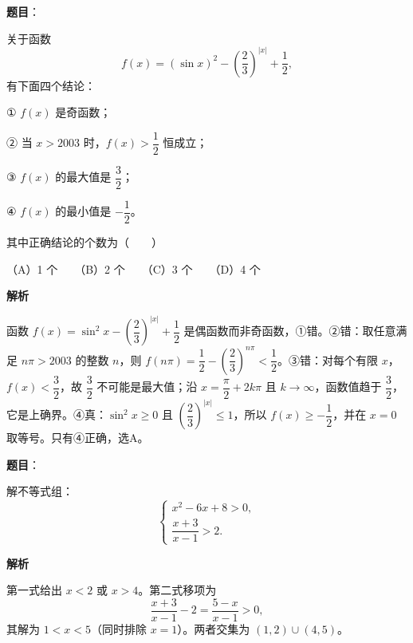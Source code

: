 \begin{answer}

\textbf{题目}：

关于函数
\nopagebreak[4]
\[
f(x)=(\sin x)^2-\left(\dfrac23\right)^{|x|}+\dfrac12,
\]
有下面四个结论：

① $f(x)$ 是奇函数；

② 当 $x>2003$ 时，$f(x)>\dfrac12$ 恒成立；

③ $f(x)$ 的最大值是 $\dfrac32$；

④ $f(x)$ 的最小值是 $-\dfrac12$。

其中正确结论的个数为\mbox{（　　）}

（A）1 个　　（B）2 个　　（C）3 个　　（D）4 个

\textbf{解析}

函数 $f(x)=\sin^2x-(\dfrac23)^{|x|}+\dfrac12$ 是偶函数而非奇函数，①错。②错：取任意满足 $n\pi>2003$ 的整数 $n$，则 $f(n\pi)=\dfrac12-(\dfrac23)^{n\pi}<\dfrac12$。③错：对每个有限 $x$，$f(x)<\dfrac32$，故 $\dfrac32$ 不可能是最大值；沿 $x=\dfrac\pi2+2k\pi$ 且 $k\to\infty$，函数值趋于 $\dfrac32$，它是上确界。④真：$\sin^2x\ge0$ 且 $(\dfrac23)^{|x|}\le1$，所以 $f(x)\ge-\dfrac12$，并在 $x=0$ 取等号。只有④正确，选A。


\end{answer}
\begin{answer}

\textbf{题目}：

解不等式组：
\nopagebreak[4]
\[
\begin{cases}
x^2-6x+8>0,\\[2pt]
\dfrac{x+3}{x-1}>2.
\end{cases}
\]

\textbf{解析}

第一式给出 $x<2$ 或 $x>4$。第二式移项为
\nopagebreak[4]
\[
\frac{x+3}{x-1}-2=\frac{5-x}{x-1}>0,
\]
其解为 $1<x<5$（同时排除 $x=1$）。两者交集为 $(1,2)\cup(4,5)$。


\end{answer}
